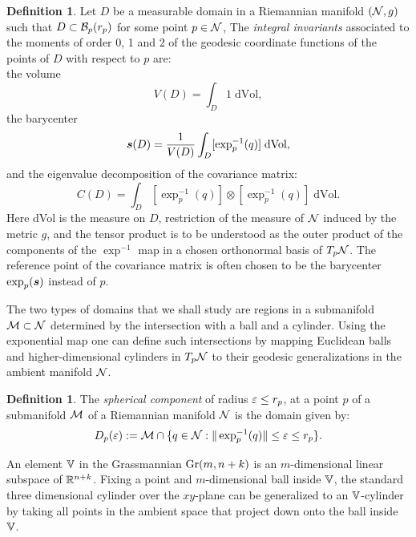 \documentclass[letterpaper, reqno, 11pt]{amsart}
\theoremstyle{definition}
\newtheorem{definition}[theorem]{Definition}
\theoremstyle{remark}
\numberwithin{equation}{section}
\begin{document}
\begin{definition}
	Let $D$ be a measurable domain in a Riemannian manifold $(\mathcal{N},g)$ such that $D\subset {\mathcal B}_p(r_p)$ for some point $p\in\mathcal{N}$, The \emph{integral invariants} associated to the moments of order 0, 1 and 2 of the geodesic coordinate functions of the points of $D$ with respect to $p$ are: \\
	the volume
	\begin{equation}
		V(D) = \int_D 1\; \text{dVol},
	\end{equation}
	the barycenter
	\begin{equation}
		\boldsymbol{s}(D) = \frac{1}{V(D)}\int_D [\exp_p^{-1}(q)] \; \text{dVol},
	\end{equation} 
	and the eigenvalue decomposition of the covariance matrix:
	\begin{equation}
		C(D) =\int_D [\exp_{p}^{-1}(q)]\otimes [\exp_p^{-1}(q)] \; \text{dVol}.
	\end{equation} 
	Here dVol is the measure on $D$, restriction of the measure of $\mathcal{N}$ induced by the metric $g$, and the tensor product is to be understood as the outer product of the components of the $\exp^{-1}$ map in a chosen orthonormal basis of $T_p\mathcal{N}$. The reference point of the covariance matrix is often chosen to be the barycenter $\exp_p(\boldsymbol{s})$ instead of $p$.
\end{definition}

The two types of domains that we shall study are regions in a submanifold ${\mathcal M}\subset\mathcal{N}$ determined by the intersection with a ball and a cylinder. Using the exponential map one can define such intersections by mapping Euclidean balls and higher-dimensional cylinders in $T_p\mathcal{N}$ to their geodesic generalizations in the ambient manifold $\mathcal{N}$.

\begin{definition}
	The \emph{spherical component} of radius $\varepsilon\leq r_p$, at a point $p$ of a submanifold ${\mathcal M}$ of a Riemannian manifold $\mathcal{N}$ is the domain given by:
\begin{equation}
	D_p(\varepsilon):={\mathcal M}\cap \{q\in\mathcal{N}: \|\exp_p^{-1}(q)\|\leq\varepsilon\leq r_p \}.
\end{equation}
\end{definition}

An element $\mathbb{V}$ in the Grassmannian $\mathrm{Gr}({m},{n+k})$ is an $m$-dimensional linear subspace of ${\mathbb R}^{n+k}$. Fixing a point and $m$-dimensional ball inside $\mathbb{V}$, the standard three dimensional cylinder over the $xy$-plane can be generalized to an $\mathbb{V}$-cylinder by taking all points in the ambient space that project down onto the ball inside $\mathbb{V}$.
\end{document}
